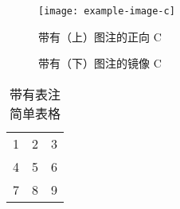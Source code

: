 \documentclass{ctexart}
\begin{document}
\begin{figure}
  \caption{带有（上）图注的正向 C}
  \centering
  \texttt{[image: example-image-c]}
\end{figure}

\begin{figure}
\centering
\caption{带有（下）图注的镜像 C}
\end{figure}

\begin{table}
\centering
  \begin{tabular}{| l c r |}
  \hline
  1 & 2 & 3 \\
  4 & 5 & 6 \\
  7 & 8 & 9 \\
  \hline
  \end{tabular}
\caption{带有表注简单表格}
\end{table}
\end{document}
